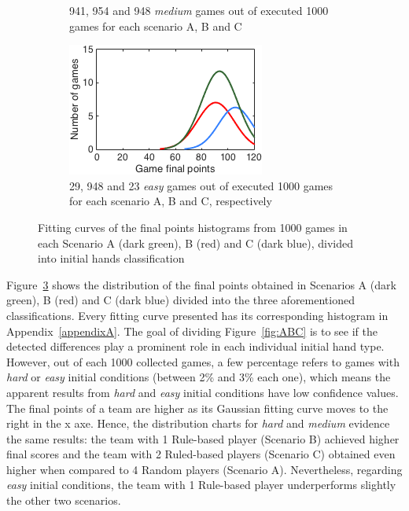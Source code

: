 \begin{figure}[h]
\begin{subfigure}[h]{0.32\textwidth}
                \caption{941, 954 and 948 \emph{medium} games out of executed 1000 games for each scenario A, B and C}
                \label{fig:ABC-Hmedium}
        \end{subfigure}
        \begin{subfigure}[h]{0.32\textwidth}
                \includegraphics[width=\textwidth]{./img/4/ABCeasy}
                \caption{29, 948 and 23 \emph{easy} games out of executed 1000 games for each scenario A, B and C, respectively}
                \label{fig:ABC-Heasy}
        \end{subfigure}
        \caption{Fitting curves of the final points histograms from 1000 games in each Scenario A (dark green), B (red) and C (dark blue), divided into initial hands classification}
        \label{fig:ABC-CH}
\end{figure}

Figure~\ref{fig:ABC-CH} shows the distribution of the final points obtained in Scenarios A (dark green), B (red) and C (dark blue) divided into the three aforementioned classifications.
Every fitting curve presented has its corresponding histogram in Appendix~\ref{appendixA}.
The goal of dividing Figure~\ref{fig:ABC} is to see if the detected differences play a prominent role in each individual initial hand type.
However, out of each 1000 collected games, a few percentage refers to games with \emph{hard} or \emph{easy} initial conditions (between 2\% and 3\% each one), which means the apparent results from \emph{hard} and \emph{easy} initial conditions have low confidence values.
The final points of a team are higher as its Gaussian fitting curve moves to the right in the x axe.
Hence, the distribution charts for \emph{hard} and \emph{medium} evidence the same results: the team with 1 Rule-based player (Scenario B) achieved higher final scores and the team with 2 Ruled-based players (Scenario C) obtained even higher when compared to 4 Random players (Scenario A).
Nevertheless, regarding \emph{easy} initial conditions, the team with 1 Rule-based player underperforms slightly the other two scenarios.

